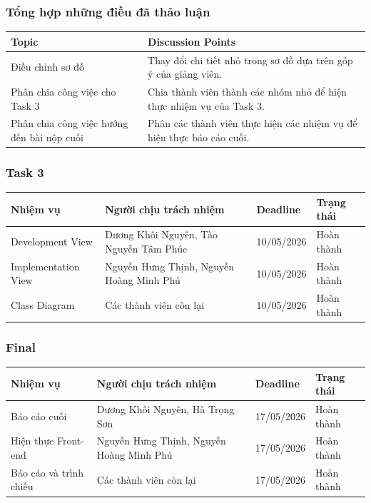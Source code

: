 \subsubsection*{Tổng hợp những điều đã thảo luận}

\begin{longtable}{|p{4cm}|p{10cm}|}
\hline
\textbf{Topic} & \textbf{Discussion Points} \\
\hline
Điều chỉnh sơ đồ & Thay đổi chi tiết nhỏ trong sơ đồ dựa trên góp ý của giảng viên. \\
\hline
Phân chia công việc cho Task 3 & Chia thành viên thành các nhóm nhỏ để hiện thực nhiệm vụ của Task 3.\\
\hline
Phân chia công việc hướng đến bài nộp cuối & Phân các thành viên thực hiện các nhiệm vụ để hiện thực báo cáo cuối. \\
\hline
\end{longtable}

\subsubsection*{Task 3}

\begin{longtable}{|p{5cm}|p{6cm}|p{2.5cm}|p{2.5cm}|}
\hline
\textbf{Nhiệm vụ} & \textbf{Người chịu trách nhiệm} & \textbf{Deadline} & \textbf{Trạng thái} \\
\hline
Development View & Dương Khôi Nguyên, Tào Nguyễn Tâm Phúc & 10/05/2026 & Hoàn thành \\
\hline
Implementation View & Nguyễn Hưng Thịnh, Nguyễn Hoàng Minh Phú & 10/05/2026 & Hoàn thành \\
\hline
Class Diagram & Các thành viên còn lại & 10/05/2026 & Hoàn thành \\
\hline
\end{longtable}

\subsubsection*{Final}

\begin{longtable}{|p{5cm}|p{6cm}|p{2.5cm}|p{2.5cm}|}
\hline
\textbf{Nhiệm vụ} & \textbf{Người chịu trách nhiệm} & \textbf{Deadline} & \textbf{Trạng thái} \\
\hline
Báo cáo cuối & Dương Khôi Nguyên, Hà Trọng Sơn & 17/05/2026 & Hoàn thành \\
\hline
Hiện thực Front-end & Nguyễn Hưng Thịnh, Nguyễn Hoàng Minh Phú & 17/05/2026 & Hoàn thành \\
\hline
Báo cáo và trình chiếu & Các thành viên còn lại & 17/05/2026 & Hoàn thành \\
\hline
\end{longtable}